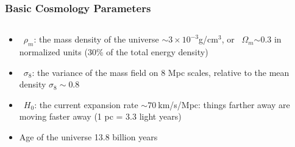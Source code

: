 \documentclass{beamer}
\newcommand{\gsigma}{\mbox{{\color{gold} $\sigma_8$}}}
\newcommand{\gH}{\mbox{{\color{gold} $H_0$}}}
\newcommand{\gomegam}{\mbox{{\color{gold} $\Omega_m$}}}
\newcommand{\grhom}{\mbox{{\color{gold} $\rho_m$}}}
\begin{document}
\frame
{
    \frametitle{Basic Cosmology Parameters}


    \begin{columns}
        \begin{column}{0.5\textwidth}    
            \begin{itemize}

                \item \grhom: the mass density of the universe $\sim 3 \times
                    10^{-3}$g/cm$^3$, or \gomegam$\sim 0.3$ in normalized
                    units (30\% of the total energy density)

                \item \gsigma: the variance of the mass field on 8 Mpc
                    scales, relative to the mean density $\sigma_8 \sim 0.8$

                \item \gH: the current expansion rate $\sim 70~ $km/s/Mpc:
                    things farther away are moving faster away\newline
                    {\color{cadetblue}(1 pc = 3.3 light years)}

                \item Age of the universe 13.8 billion years


\end{itemize}
\end{column}
\end{columns}}
\end{document}
